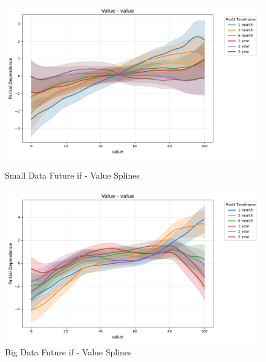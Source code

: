 \documentclass[11pt,english,a4paper,hidelinks]{book}
\begin{document}
\begin{figure}[H]
    \centering
    \begin{minipage}{0.48\textwidth}
        \centering
        \includegraphics[width=\textwidth]{images/code/models/general_regression/splines/2D/Small Data future - IF/value_value.png}
        \caption{Small Data Future \acrshort{if} - Value Splines}
        \label{fig:spline_value_value}
    \end{minipage}\hfill
    \begin{minipage}{0.48\textwidth}
        \centering
        \includegraphics[width=\textwidth]{images/code/models/general_regression/splines/2D/Big Data future - IF HARD Balanced/value_value.png}
        \caption{Big Data Future \acrshort{if} - Value Splines}
        \label{fig:spline_value_value_balanced}
    \end{minipage}
\end{figure}
\end{document}
